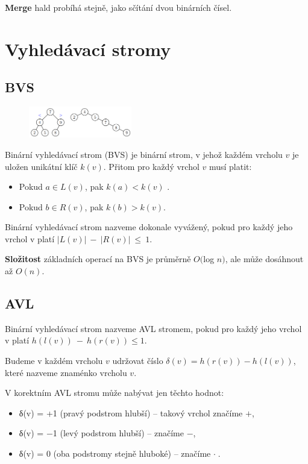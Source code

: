 \documentclass{szzclass}
\begin{document}
\textbf{Merge} hald probíhá stejně, jako sčítání dvou binárních čísel.


\newpage

\section{Vyhledávací stromy}

\subsection{BVS}

\begin{figure}[h]
\centering
\includegraphics[width=0.4\textwidth]{topics/bi-spol-05/images/bvs.png}
\end{figure}

Binární vyhledávací strom (BVS) je binární strom, v jehož
každém vrcholu $v$ je uložen unikátní klíč $k(v)$. Přitom pro každý
vrchol $v$ musí platit:
\begin{itemize}
    \item Pokud $a \in L(v)$, pak $k(a) < k(v)$ .
    \item Pokud $b \in R(v)$, pak $k(b) > k(v)$.
\end{itemize}

Binární vyhledávací strom nazveme dokonale vyvážený, pokud pro každý jeho vrchol v platí $|L(v)|~-~|R(v)|~\leq~1$.

\textbf{Složitost} základních operací na BVS je průměrně $O($log $n)$, ale může dosáhnout až $O(n)$.

\subsection{AVL}

Binární vyhledávací strom nazveme AVL stromem, pokud pro každý
jeho vrchol v platí $h(l(v))~−~h(r(v)) \leq 1$.

Budeme v každém vrcholu $v$ udržovat číslo $δ(v) = h(r(v)) - h(l(v))$, které nazveme znaménko vrcholu $v$.

V korektním AVL stromu může nabývat jen těchto hodnot:
\begin{itemize}
    \item δ(v) = +1 (pravý podstrom hlubší) – takový vrchol značíme \textcircled{$+$},
    \item δ(v) = −1 (levý podstrom hlubší) – značíme \textcircled{$-$},
    \item δ(v) = 0 (oba podstromy stejně hluboké) – značíme \textcircled{$\cdot$}.
\end{itemize}
\end{document}

